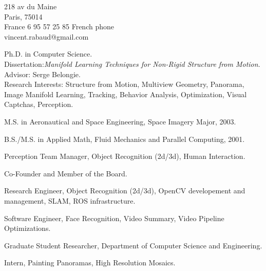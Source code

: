 

\addresses
{218 av du Maine\\
Paris, 75014\\
France}
{
6 95 57 25 85 French phone\\
vincent.rabaud@gmail.com}

\begin{llist}

 
Ph.D. in Computer Science.\\
Dissertation:\textit{Manifold Learning Techniques for Non-Rigid Structure from
Motion}.\\
Advisor: Serge Belongie.\\
Research Interests: Structure from Motion, Multiview Geometry, Panorama, Image Manifold Learning, Tracking, Behavior Analysis, Optimization, Visual Captchas, Perception.

 
M.S. in Aeronautical and Space Engineering, Space Imagery Major, 2003.

 
B.S./M.S. in Applied Math, Fluid Mechanics and Parallel Computing, 2001.

Perception Team Manager, Object Recognition (2d/3d), Human Interaction.

Co-Founder and Member of the Board.

Research Engineer, Object Recognition (2d/3d), OpenCV developement and management, SLAM, ROS infrastructure.

Software Engineer, Face Recognition, Video Summary, Video Pipeline
Optimizations.

Graduate Student Researcher, Department of Computer Science and Engineering.

Intern, Painting Panoramas, High Resolution Mosaics.


\end{llist}
